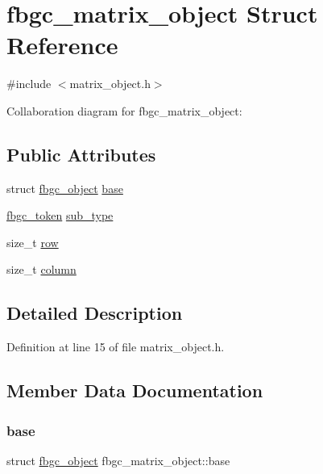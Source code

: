 \hypertarget{structfbgc__matrix__object}{}\section{fbgc\+\_\+matrix\+\_\+object Struct Reference}
\label{structfbgc__matrix__object}


{\ttfamily \#include $<$matrix\+\_\+object.\+h$>$}



Collaboration diagram for fbgc\+\_\+matrix\+\_\+object\+:
\subsection*{Public Attributes}
\begin{DoxyCompactItemize}
\item 
struct \hyperlink{structfbgc__object}{fbgc\+\_\+object} \hyperlink{structfbgc__matrix__object_ad5619e465e82da1224f3bd310a0868c0}{base}
\item 
\hyperlink{tokens_8h_a9d21ebbf42e602eb0cf502c867d20a7e}{fbgc\+\_\+token} \hyperlink{structfbgc__matrix__object_acf6def65e43e5fa765a4479365a4d653}{sub\+\_\+type}
\item 
size\+\_\+t \hyperlink{structfbgc__matrix__object_a398dc517a5a86968ca33b1addd2702c8}{row}
\item 
size\+\_\+t \hyperlink{structfbgc__matrix__object_a7c2a97b51968eebb093c6f658edc7f7d}{column}
\end{DoxyCompactItemize}


\subsection{Detailed Description}


Definition at line 15 of file matrix\+\_\+object.\+h.



\subsection{Member Data Documentation}
\mbox{\label{structfbgc__matrix__object_ad5619e465e82da1224f3bd310a0868c0}} 
\subsubsection{\texorpdfstring{base}{base}}
{\footnotesize\ttfamily struct \hyperlink{structfbgc__object}{fbgc\+\_\+object} fbgc\+\_\+matrix\+\_\+object\+::base}



